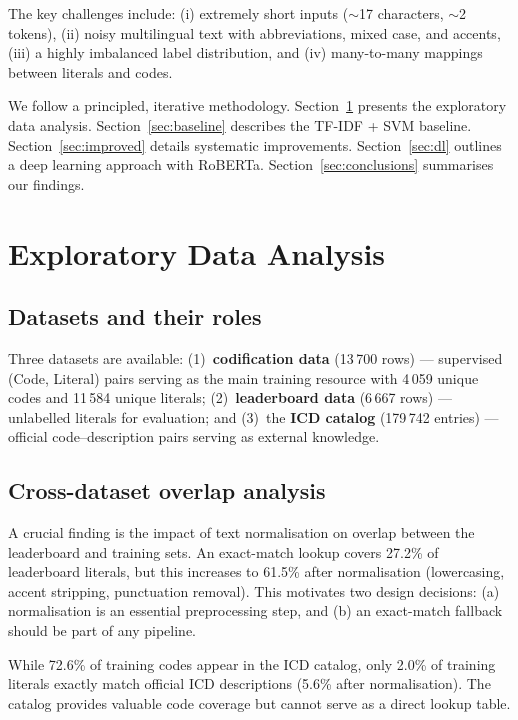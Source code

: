 \documentclass{article}
\begin{document}
The key challenges include: (i) extremely short inputs ($\sim$17 characters, $\sim$2 tokens), (ii) noisy multilingual text with abbreviations, mixed case, and accents, (iii) a highly imbalanced label distribution, and (iv) many-to-many mappings between literals and codes.

We follow a principled, iterative methodology. Section~\ref{sec:eda} presents the exploratory data analysis. Section~\ref{sec:baseline} describes the TF-IDF + SVM baseline. Section~\ref{sec:improved} details systematic improvements. Section~\ref{sec:dl} outlines a deep learning approach with RoBERTa. Section~\ref{sec:conclusions} summarises our findings.

\section{Exploratory Data Analysis}
\label{sec:eda}

\subsection{Datasets and their roles}
\label{ssec:datasets}

Three datasets are available: (1)~\textbf{codification data} (13\,700 rows) — supervised (Code, Literal) pairs serving as the main training resource with 4\,059 unique codes and 11\,584 unique literals; (2)~\textbf{leaderboard data} (6\,667 rows) — unlabelled literals for evaluation; and (3)~the \textbf{ICD catalog} (179\,742 entries) — official code--description pairs serving as external knowledge.

\subsection{Cross-dataset overlap analysis}
\label{ssec:overlap}

A crucial finding is the impact of text normalisation on overlap between the leaderboard and training sets. An exact-match lookup covers 27.2\% of leaderboard literals, but this increases to 61.5\% after normalisation (lowercasing, accent stripping, punctuation removal). This motivates two design decisions: (a) normalisation is an essential preprocessing step, and (b) an exact-match fallback should be part of any pipeline.

While 72.6\% of training codes appear in the ICD catalog, only 2.0\% of training literals exactly match official ICD descriptions (5.6\% after normalisation). The catalog provides valuable code coverage but cannot serve as a direct lookup table.
\end{document}
